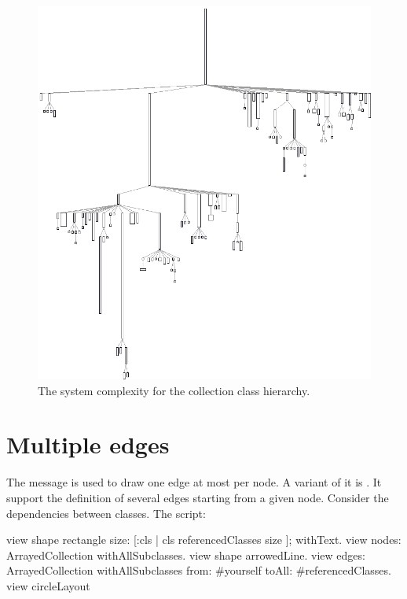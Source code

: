 \documentclass[a4paper,10pt,twoside]{book}
\begin{document}
\begin{figure}[htbp]
\centerline{\includegraphics[width=\linewidth]{picture5}}
\caption{The system complexity for the collection class hierarchy.}
\label{fig:picture5}
\end{figure}


\section{Multiple edges}

The message  is used to draw one edge at most per node. A variant of it is . It support the definition of several edges starting from a given node. Consider the dependencies between classes. The script: 

\begin{code}{}
view shape rectangle
	size: [:cls | cls referencedClasses size ];
	withText.
view nodes: ArrayedCollection withAllSubclasses.
view shape arrowedLine.
view 
	edges: ArrayedCollection withAllSubclasses from: #yourself toAll: #referencedClasses.
view circleLayout
\end{code}
\end{document}
